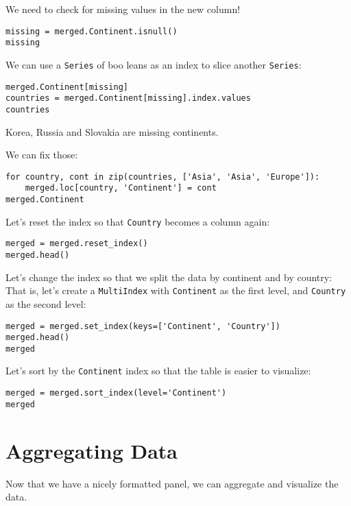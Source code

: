 \documentclass[12pt, a4paper]{article}
\begin{document}
We need to check for missing values in the new column!
\lstset{language=jupyter-python,label= ,caption= ,captionpos=b,numbers=none}
\begin{lstlisting}
missing = merged.Continent.isnull()
missing
\end{lstlisting}

We can use a \texttt{Series} of boo leans as an index to slice another \texttt{Series}:
\lstset{language=jupyter-python,label= ,caption= ,captionpos=b,numbers=none}
\begin{lstlisting}
merged.Continent[missing]
countries = merged.Continent[missing].index.values
countries
\end{lstlisting}
Korea, Russia and Slovakia are missing continents.

We can fix those:
\lstset{language=jupyter-python,label= ,caption= ,captionpos=b,numbers=none}
\begin{lstlisting}
for country, cont in zip(countries, ['Asia', 'Asia', 'Europe']):
    merged.loc[country, 'Continent'] = cont
merged.Continent
\end{lstlisting}

Let's reset the index so that \texttt{Country} becomes a column again:
\lstset{language=jupyter-python,label= ,caption= ,captionpos=b,numbers=none}
\begin{lstlisting}
merged = merged.reset_index()
merged.head()
\end{lstlisting}

Let's change the index so that we split the data by continent and by country:
That is, let's create a \texttt{MultiIndex} with \texttt{Continent} as the first level, and \texttt{Country} as the second level:
\lstset{language=jupyter-python,label= ,caption= ,captionpos=b,numbers=none}
\begin{lstlisting}
merged = merged.set_index(keys=['Continent', 'Country'])
merged.head()
merged
\end{lstlisting}

Let's sort by the \texttt{Continent} index so that the table is easier to visualize:
\lstset{language=jupyter-python,label= ,caption= ,captionpos=b,numbers=none}
\begin{lstlisting}
merged = merged.sort_index(level='Continent')
merged
\end{lstlisting}
\section{Aggregating Data}
\label{sec:orgdedc33f}
Now that we have a nicely formatted panel, we can aggregate and visualize the data.
\end{document}
